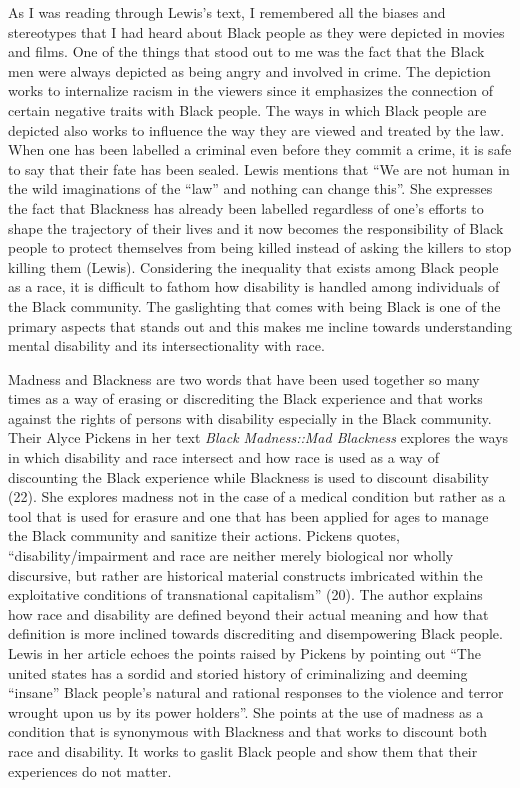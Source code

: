 \documentclass[11pt]{article}
\begin{document}
As I was reading through Lewis’s text, I remembered all the biases and stereotypes that I had heard about Black people as they were depicted in movies and films. One of the things that stood out to me was the fact that the Black men were always depicted as being angry and involved in crime. The depiction works to internalize racism in the viewers since it emphasizes the connection of certain negative traits with Black people. The ways in which Black people are depicted also works to influence the way they are viewed and treated by the law. When one has been labelled a criminal even before they commit a crime, it is safe to say that their fate has been sealed. Lewis mentions that “We are not human in the wild imaginations of the “law” and nothing can change this”. She expresses the fact that Blackness has already been labelled regardless of one’s efforts to shape the trajectory of their lives and it now becomes the responsibility of Black people to protect themselves from being killed instead of asking the killers to stop killing them (Lewis). Considering the inequality that exists among Black people as a race, it is difficult to fathom how disability is handled among individuals of the Black community. The gaslighting that comes with being Black is one of the primary aspects that stands out and this makes me incline towards understanding mental disability and its intersectionality with race.

Madness and Blackness are two words that have been used together so many times as a way of erasing or discrediting the Black experience and that works against the rights of persons with disability especially in the Black community. Their Alyce Pickens in her text \textit{Black Madness::Mad Blackness} explores the ways in which disability and race intersect and how race is used as a way of discounting the Black experience while Blackness is used to discount disability (22). She explores madness not in the case of a medical condition but rather as a tool that is used for erasure and one that has been applied for ages to manage the Black community and sanitize their actions. Pickens quotes, “disability/impairment and race are neither merely biological nor wholly discursive, but rather are historical material constructs imbricated within the exploitative conditions of transnational capitalism” (20). The author explains how race and disability are defined beyond their actual meaning and how that definition is more inclined towards discrediting and disempowering Black people. Lewis in her article echoes the points raised by Pickens by pointing out “The united states has a sordid and storied history of criminalizing and deeming “insane” Black people’s natural and rational responses to the violence and terror wrought upon us by its power holders”. She points at the use of madness as a condition that is synonymous with Blackness and that works to discount both race and disability. It works to gaslit Black people and show them that their experiences do not matter.
\end{document}
